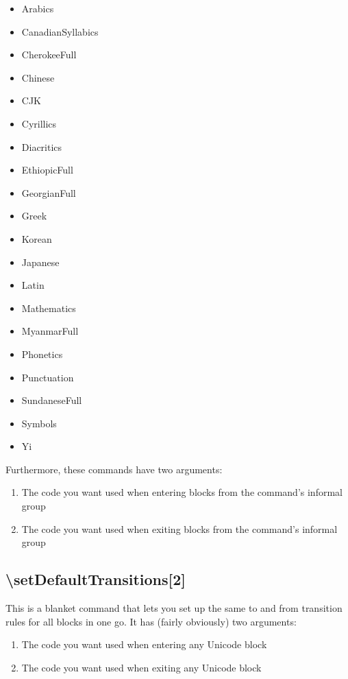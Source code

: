 ﻿\documentclass{article}
\newenvironment{itemlist}{%
  \begin{itemize}
	\setlength{\itemsep}{0pt}
	\setlength{\parsep}{0pt}
	\setlength{\topsep}{0pt}
	\setlength{\partopsep}{0pt}
	\setlength{\parskip}{0pt}
	\setlength{\labelsep}{5pt}}%
{
  \end{itemize}}
\newenvironment{numberlist}{%
  \begin{enumerate}
	\setlength{\itemsep}{0pt}
	\setlength{\parsep}{0pt}
	\setlength{\topsep}{0pt}
	\setlength{\partopsep}{0pt}
	\setlength{\parskip}{0pt}
	\setlength{\labelsep}{5pt}}%
{
  \end{enumerate}}
\begin{document}
			\begin{itemlist}
				\item Arabics
				\item CanadianSyllabics
				\item CherokeeFull
				\item Chinese
				\item CJK
				\item Cyrillics
				\item Diacritics
				\item EthiopicFull
				\item GeorgianFull
				\item Greek
				\item Korean
				\item Japanese
				\item Latin
				\item Mathematics
				\item MyanmarFull
				\item Phonetics
				\item Punctuation
				\item SundaneseFull
				\item Symbols
				\item Yi
			\end{itemlist}

			Furthermore, these commands have two arguments:

			\begin{numberlist}
				\item The code you want used when entering blocks from the command's informal group
				\item The code you want used when exiting blocks from the command's informal group
			\end{numberlist}

		\subsection{\textbackslash setDefaultTransitions[2]}

			This is a blanket command that lets you set up the same to and from transition rules for all blocks in one go. It has (fairly obviously) two arguments:

			\begin{numberlist}
				\item The code you want used when entering any Unicode block
				\item The code you want used when exiting any Unicode block
			\end{numberlist}
\end{document}
